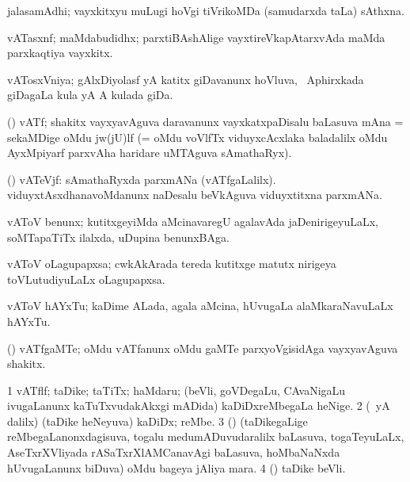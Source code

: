 \bentry
{} 
\gl{\nA}
\expl{}
\bmng
jalasamAdhi; vayxkitxyu muLugi hoVgi tiVrikoMDa (samudarxda taLa) sAthxna. 
\emng
\eentry

\bentry
{} 
\gl{\nA}
\expl{}
\bmng
vATasxnf; maMdabudidhx; parxtiBAshAlige vayxtireVkapAtarxvAda maMda parxkaqtiya vayxkitx. 
\emng
\eentry

\bentry
{} 
\gl{\nA}
\expl{}
\bmng
vATosxVniya; gAlxDiyolasf yA katitx giDavanunx hoVluva, \da\ Aphirxkada giDagaLa kula yA A kulada giDa. 
\emng
\eentry

\bentry
{} 
\gl{\nA}
\expl{}
\bmng
(\Bwvi) vATf; shakitx vayxyavAguva daravanunx vayxkatxpaDisalu baLasuva mAna = sekaMDige oMdu jw(jU)lf (= oMdu voVlfTx viduyxcAcxlaka baladalilx oMdu AyxMpiyarf parxvAha haridare uMTAguva sAmathaRyx). 
\emng
\eentry

\bentry
{} 
\gl{\nA}
\expl{}
\bmng
(\Bwvi) vATeVjf: 
\banum
{} sAmathaRyxda parxmANa (vATfgaLalilx). 
 viduyxtAsxdhanavoMdanunx naDesalu beVkAguva viduyxtitxna parxmANa. 
\eanum
\emng
\eentry

\bentry
{} 
\gl{\nA}
\expl{}
\bmng
vAToV benunx; kutitxgeyiMda aMcinavaregU agalavAda jaDenirigeyuLaLx, soMTapaTiTx ilalxda, uDupina benunxBAga. 
\emng
\eentry

\bentry
{} 
\gl{\nA}
\expl{}
\bmng
vAToV oLagupapxsa; cwkAkArada tereda kutitxge matutx nirigeya toVLutudiyuLaLx oLagupapxsa. 
\emng
\eentry

\bentry
{} 
\gl{\nA}
\expl{}
\bmng
vAToV hAYxTu; kaDime ALada, agala aMcina, hUvugaLa alaMkaraNavuLaLx hAYxTu. 
\emng
\eentry

\bentry
{} 
\gl{\nA}
\expl{}
\bmng
(\viduyx) vATfgaMTe; oMdu vATfanunx oMdu gaMTe parxyoVgisidAga vayxyavAguva shakitx. 
\emng
\eentry

\bentry
{} 
\gl{\nA}
\expl{}
\bmng
\bnum
\num{1} vATflf; taDike; taTiTx; haMdaru; (beVli, goVDegaLu, CAvaNigaLu ivugaLanunx kaTuTxvudakAkxgi mADida) kaDiDxreMbegaLa heNige. 
\num{2} (\Eva\ yA \bava dalilx) (taDike heNeyuva) kaDiDx; reMbe. 
\num{3} (\AseTxrXV) (taDikegaLige reMbegaLanonxdagisuva, togalu medumADuvudaralilx baLasuva, togaTeyuLaLx, AseTxrXVliyada rASaTxrXlAMCanavAgi baLasuva, hoMbaNaNxda hUvugaLanunx biDuva) oMdu bageya jAliya mara. 
\num{4} (\pArxM) taDike beVli. 
\enum
\emng

